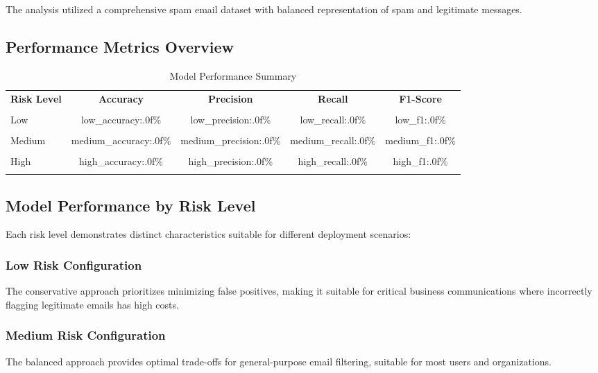 \documentclass[12pt,a4paper]{article}
\begin{document}
The analysis utilized a comprehensive spam email dataset with balanced representation of spam and legitimate messages.

\subsection{Performance Metrics Overview}

\begin{table}[H]
\centering
\caption{Model Performance Summary}
\begin{tabular}{@{}lcccc@{}}
\toprule
\textbf{Risk Level} & \textbf{Accuracy} & \textbf{Precision} & \textbf{Recall} & \textbf{F1-Score} \\\\
\midrule
Low & {low_accuracy:.0f}\% & {low_precision:.0f}\% & {low_recall:.0f}\% & {low_f1:.0f}\% \\\\
Medium & {medium_accuracy:.0f}\% & {medium_precision:.0f}\% & {medium_recall:.0f}\% & {medium_f1:.0f}\% \\\\
High & {high_accuracy:.0f}\% & {high_precision:.0f}\% & {high_recall:.0f}\% & {high_f1:.0f}\% \\\\
\bottomrule
\end{tabular}
\end{table}


\subsection{Model Performance by Risk Level}

Each risk level demonstrates distinct characteristics suitable for different deployment scenarios:

\subsubsection{Low Risk Configuration}
The conservative approach prioritizes minimizing false positives, making it suitable for critical business communications where incorrectly flagging legitimate emails has high costs.

\subsubsection{Medium Risk Configuration}  
The balanced approach provides optimal trade-offs for general-purpose email filtering, suitable for most users and organizations.
\end{document}
